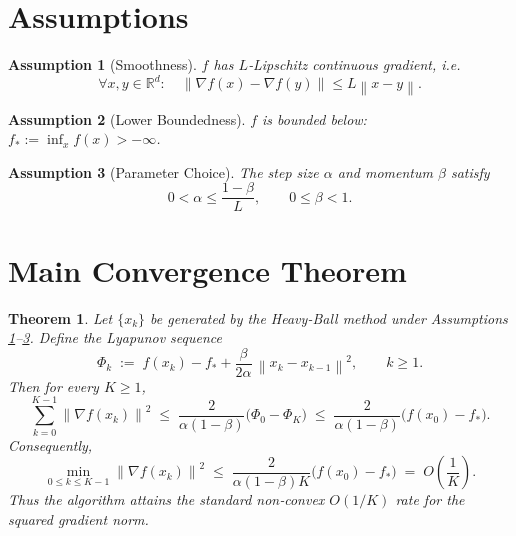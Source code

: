 \documentclass{article}
\newtheorem{theorem}{Theorem}
\newtheorem{assumption}{Assumption}
\newcommand{\norm}[1]{\left\lVert#1\right\rVert}
\begin{document}
\newpage

\section*{Assumptions}
\begin{assumption}[Smoothness]\label{as:Lsmooth}
$f$ has $L$‑Lipschitz continuous gradient, i.e.
\[
\forall x,y\in\mathbb{R}^d:\quad
\norm{\nabla f(x)-\nabla f(y)}\le L\norm{x-y}.
\]
\end{assumption}
\begin{assumption}[Lower Boundedness]\label{as:lowerbound}
$f$ is bounded below: $f_*:=\inf_{x}f(x)>-\infty$.
\end{assumption}
\begin{assumption}[Parameter Choice]\label{as:params}
The step size $\alpha$ and momentum $\beta$ satisfy
\[
0<\alpha\le \frac{1-\beta}{L},\qquad 0\le\beta<1.
\]
\end{assumption}

\section*{Main Convergence Theorem}
\begin{theorem}\label{thm:hb}
Let $\{x_k\}$ be generated by the Heavy‑Ball method under Assumptions \ref{as:Lsmooth}–\ref{as:params}.  
Define the Lyapunov sequence
\[
\Phi_k\;:=\;f(x_k)-f_*+\frac{\beta}{2\alpha}\,\norm{x_k-x_{k-1}}^2,\qquad k\ge 1.
\]
Then for every $K\ge 1$,
\[
\sum_{k=0}^{K-1}\norm{\nabla f(x_k)}^2
\;\le\;
\frac{2}{\alpha(1-\beta)}\bigl(\Phi_0-\Phi_K\bigr)
\;\le\;
\frac{2}{\alpha(1-\beta)}\bigl(f(x_0)-f_*\bigr).
\]
Consequently,
\[
\min_{0\le k\le K-1}\norm{\nabla f(x_k)}^2
\;\le\;
\frac{2}{\alpha(1-\beta)K}\bigl(f(x_0)-f_*\bigr)
\;=\;O\!\left(\frac{1}{K}\right).
\]
Thus the algorithm attains the standard non‑convex $O(1/K)$ rate for the squared gradient norm.
\end{theorem}
\end{document}
